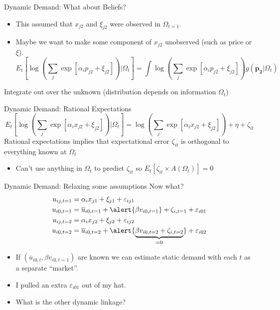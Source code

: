 \documentclass[xcolor=pdftex,dvipsnames,table,mathserif,aspectratio=169]{beamer}
\begin{document}
\begin{frame}{Dynamic Demand: What about Beliefs?}
\begin{itemize}
\item This assumed that $x_{j2}$ and $\xi_{j2}$ were observed in $\Omega_{t=1}$.
\item Maybe we want to make some component of $x_{j2}$ \alert{unobserved} (such as price or $\xi$).
$$
E_t\left[ \log \left( \sum_j \exp [ \alpha_i p_{j2}  +  \xi_{j2} ] \right)\big| \Omega_t\right]= 
\int \log \left( \sum_j \exp [ \alpha_i p_{j2}  +  \xi_{j2} ] \right)  g(\mathbf{p_2} | \Omega_t) 
$$
\end{itemize}
Integrate out over the unknown (distribution depends on information $\Omega_t$)
\end{frame}

\begin{frame}{Dynamic Demand: Rational Expectations}
$$
E_t\left[ \log \left( \sum_j \exp [ \alpha_i x_{j2}  +  \xi_{j2} ] \right)\big| \Omega_t\right]= 
\log \left( \sum_j \exp [ \alpha_i x_{j2}  +  \xi_{j2} ] \right)  + \eta+  \zeta_{it}
$$
Rational expectations implies that expectational error $\zeta_{it}$ is orthogonal to everything known at $\Omega_t$
\begin{itemize}
\item Can't use anything in $\Omega_t$ to predict $\zeta_{it}$ so $E_t[\zeta_{it} \times A(\Omega_t)]=0$
\end{itemize}
\end{frame}

\begin{frame}{Dynamic Demand: Relaxing some assumptions}
Now what?
\begin{align*}
u_{ij,t=1} &=   \alpha_i x_{j1}  +  \xi_{j1} + \varepsilon_{ij1}\\
u_{i0,t=1} &=  \overline{u}_{i0,t=1}+  \alert{\beta v_{i0,t=1}} + \zeta_{i,t=1}+ \varepsilon_{i01} \\
u_{ij,t=2} &=   \alpha_i x_{j2}  +  \xi_{j2} + \varepsilon_{ij2}\\
u_{i0,t=2} &= \overline{u}_{i0,t=2} +  \alert{\underbrace{\beta v_{i0,t=2}+ \zeta_{i,t=2} }_{=0}}+\varepsilon_{i02} 
\end{align*}
\vspace{-.5cm}
\begin{itemize}
\item If $(\overline{u}_{i0,t}, \beta v_{i0,t=1})$ are known we can estimate static demand with each $t$ as a separate ``market''.
\item I pulled an extra $\varepsilon_{i01}$ out of my hat.
\item What is the other dynamic linkage?
\end{itemize}
\end{frame}
\end{document}
